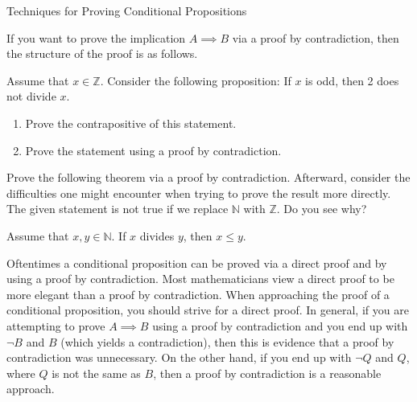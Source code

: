\begin{section}{Techniques for Proving Conditional Propositions}
\begin{skeleton}\label{pf by contradiction for implication}
If you want to prove the implication $A\implies B$ via a proof by contradiction, then the structure of the proof is as follows.

\begin{center}
\end{center}
\end{skeleton}

\begin{problem}
Assume that $x\in\mathbb{Z}$.  Consider the following proposition: If $x$ is odd, then 2 does not divide $x$.
\begin{enumerate}[label=\textrm{(\alph*)}]
\item Prove the contrapositive of this statement.
\item Prove the statement using a proof by contradiction.
\end{enumerate}
\end{problem}

Prove the following theorem via a proof by contradiction. Afterward, consider the difficulties one might encounter when trying to prove the result more directly. The given statement is not true if we replace $\mathbb{N}$ with $\mathbb{Z}$. Do you see why?

\begin{theorem}\label{thm:natural divisor less than or equal to natural dividend}
Assume that $x,y\in\mathbb{N}$. If $x$ divides $y$, then $x\leq y$.
\end{theorem}

Oftentimes a conditional proposition can be proved via a direct proof and by using a proof by contradiction.  Most mathematicians view a direct proof to be more elegant than a proof by contradiction. When approaching the proof of a conditional proposition, you should strive for a direct proof.  In general, if you are attempting to prove $A\implies B$ using a proof by contradiction and you end up with $\neg B$ and $B$ (which yields a contradiction), then this is evidence that a proof by contradiction was unnecessary.  On the other hand, if you end up with $\neg Q$ and $Q$, where $Q$ is not the same as $B$, then a proof by contradiction is a reasonable approach.


\end{section}
